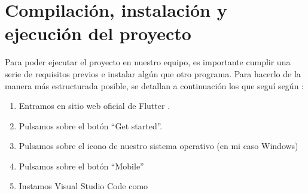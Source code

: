 

\section{Compilación, instalación y ejecución del proyecto}

	Para poder ejecutar el proyecto en nuestro equipo, es importante cumplir una serie de requisitos previos e instalar algún que otro programa. Para hacerlo de la manera más estructurada posible, se detallan a continuación los que seguí según \cite{instalacion:flutter}:
	
	\begin{enumerate}
		\item Entramos en sitio web oficial de Flutter \cite{flutter}.
		\item Pulsamos sobre el botón ``Get started''.
		\item Pulsamos sobre el icono de nuestro sistema operativo (en mi caso Windows)
		\item Pulsamos sobre el botón ``Mobile''
		\item Instamos Visual Studio Code como 
	\end{enumerate}


